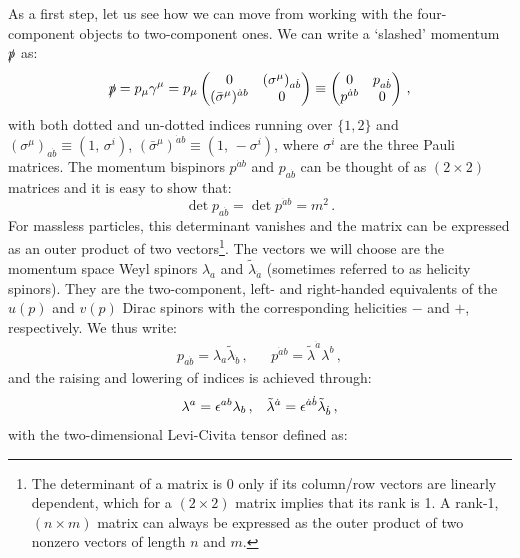 \documentclass[main.tex]{subfiles}
\begin{document}
As a first step, let us see how we can move from working with the four-component objects to two-component ones. We can write a `slashed' momentum $\slashed{p}$ as:
\begin{equation} \label{eq:pslashed1}
    \slashed{p} = p_\mu \gamma^\mu = p_\mu
    \begin{pmatrix}
    0 & (\sigma^\mu)_{a\dot{b}} \\
    (\bar{\sigma}^\mu)^{\dot{a}b} & 0
    \end{pmatrix}
    \equiv
    \begin{pmatrix}
    0 & p_{a\dot{b}} \\
    p^{\dot{a}b} & 0 
    \end{pmatrix} \,,
\end{equation}
with both dotted and un-dotted indices running over $\{1,2\}$ and $(\sigma^\mu)_{a\dot{b}} \equiv (1, \, \sigma^i)$, $(\bar{\sigma}^\mu)^{\dot{a}b} \equiv (1, \, -\sigma^i)$, where $\sigma^i$ are the three Pauli matrices. The momentum bispinors $p^{\dot{a}b}$ and $p_{a\dot{b}}$ can be thought of as $(2 \times 2)$ matrices and it is easy to show that:
\begin{equation}
    \det p_{a\dot{b}} = \det p^{\dot{a}b} = m^2\,.
\end{equation}
For massless particles, this determinant vanishes and the matrix can be expressed as an outer product of two vectors\footnote{The determinant of a matrix is 0 only if its column/row vectors are linearly dependent, which for a $(2 \times 2)$ matrix implies that its rank is 1. A rank-1, $(n \times m)$ matrix can always be expressed as the outer product of two nonzero vectors of length $n$ and $m$.}. The vectors we will choose are the momentum space Weyl spinors $\lambda_a$  and $\tilde{\lambda}_{\dot{a}}$ (sometimes referred to as helicity spinors). They are the two-component, left- and right-handed equivalents of the $u(p)$ and $v(p)$ Dirac spinors with the corresponding helicities $-$ and $+$, respectively. We thus write:
\begin{align} \label{eq:outerproduct}
    p_{a\dot{b}} = \lambda_a \tilde{\lambda}_{\dot{b}}\,, && p^{\dot{a}b} = \tilde{\lambda}^{\dot{a}} \lambda^b\,,
\end{align}
and the raising and lowering of indices is achieved through:
\begin{align}
    \lambda^a = \epsilon^{ab} \lambda_b\,, && \tilde{\lambda}^{\dot{a}} = \epsilon^{\dot{a}\dot{b}} \tilde{\lambda}_{\dot{b}} \,,
\end{align}
with the two-dimensional Levi-Civita tensor defined as:
\end{document}
